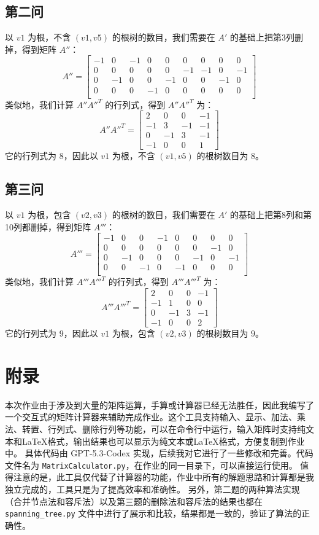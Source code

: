 \documentclass[utf8]{ctexart}
\theoremstyle{mystyle}
\begin{document}
\subsection*{第二问}
以 $v1$ 为根，不含 $(v1, v5)$ 的根树的数目，我们需要在 $A'$ 的基础上把第3列删掉，得到矩阵 $A''$：
\[
A'' = \begin{bmatrix}
-1 & 0 & -1 & 0 & 0 & 0 & 0 & 0 & 0 \\
0 & 0 & 0 & 0 & 0 & -1 & -1 & 0 & -1 \\
0 & -1 & 0 & 0 & -1 & 0 & 0 & -1 & 0 \\
0 & 0 & 0 & -1 & 0 & 0 & 0 & 0 & 0 \\
\end{bmatrix}
\]
类似地，我们计算 $A''A''^T$ 的行列式，得到 $A''A''^T$ 为：
\[
A''A''^T = \begin{bmatrix}2 & 0 & 0 & -1 \\ -1 & 3 & -1 & -1 \\ 0 & -1 & 3 & -1 \\ -1 & 0 & 0 & 1\end{bmatrix}
\]
它的行列式为 $8$，因此以 $v1$ 为根，不含 $(v1, v5)$ 的根树数目为 $8$。

\subsection*{第三问}
以 $v1$ 为根，包含 $(v2, v3)$ 的根树的数目，我们需要在 $A'$ 的基础上把第8列和第10列都删掉，得到矩阵 $A'''$：
\[
A''' = \begin{bmatrix}
-1 & 0 & 0 & -1 & 0 & 0 & 0 & 0 \\
0 & 0 & 0 & 0 & 0 & 0 & -1 & 0 \\
0 & -1 & 0 & 0 & 0 & -1 & 0 & -1 \\
0 & 0 & -1 & 0 & -1 & 0 & 0 & 0 \\
\end{bmatrix}
\]
类似地，我们计算 $A'''A'''^T$ 的行列式，得到 $A'''A'''^T$ 为：
\[
A'''A'''^T = \begin{bmatrix}
2 & 0 & 0 & -1 \\
-1 & 1 & 0 & 0 \\
0 & -1 & 3 & -1 \\
-1 & 0 & 0 & 2
\end{bmatrix}
\]
它的行列式为 $9$，因此以 $v1$ 为根，包含 $(v2, v3)$ 的根树数目为 $9$。

\section*{附录}
本次作业由于涉及到大量的矩阵运算，手算或计算器已经无法胜任，因此我编写了一个交互式的矩阵计算器来辅助完成作业。这个工具支持输入、显示、加法、乘法、转置、行列式、删除行列等功能，可以在命令行中运行，输入矩阵时支持纯文本和LaTeX格式，输出结果也可以显示为纯文本或LaTeX格式，方便复制到作业中。
具体代码由 GPT-5.3-Codex 实现，后续我对它进行了一些修改和完善。代码文件名为 \texttt{MatrixCalculator.py}，在作业的同一目录下，可以直接运行使用。
值得注意的是，此工具仅代替了计算器的功能，作业中所有的解题思路和计算都是我独立完成的，工具只是为了提高效率和准确性。
另外，第二题的两种算法实现（合并节点法和容斥法）以及第三题的删除法和容斥法的结果也都在 \texttt{spanning\_tree.py} 文件中进行了展示和比较，结果都是一致的，验证了算法的正确性。
\end{document}

